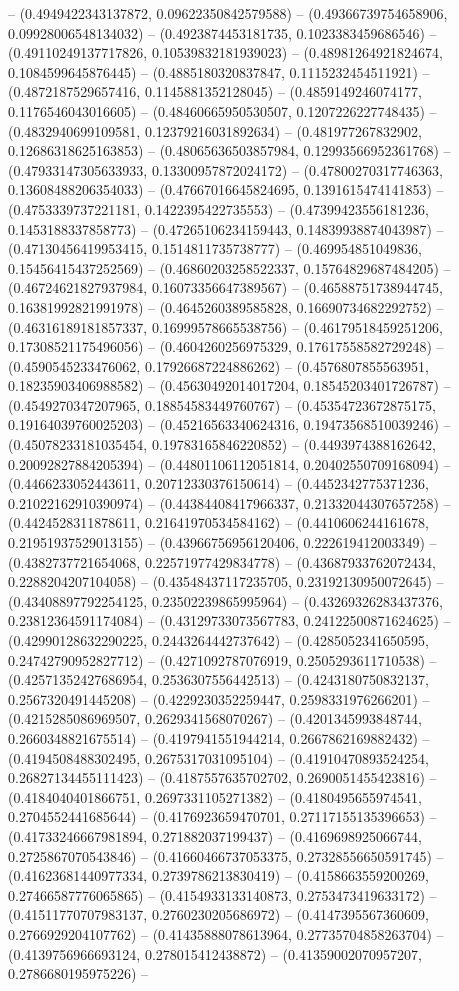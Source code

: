 -- (0.4949422343137872, 0.09622350842579588) -- (0.49366739754658906, 0.09928006548134032) -- (0.4923874453181735, 0.1023383459686546) -- (0.49110249137717826, 0.10539832181939023) -- (0.48981264921824674, 0.1084599645876445) -- (0.4885180320837847, 0.1115232454511921) -- (0.4872187529657416, 0.1145881352128045) -- (0.4859149246074177, 0.1176546043016605) -- (0.48460665950530507, 0.1207226227748435) -- (0.4832940699109581, 0.12379216031892634) -- (0.481977267832902, 0.12686318625163853) -- (0.48065636503857984, 0.12993566952361768) -- (0.47933147305633933, 0.13300957872024172) -- (0.47800270317746363, 0.13608488206354033) -- (0.47667016645824695, 0.1391615474141853) -- (0.4753339737221181, 0.1422395422735553) -- (0.47399423556181236, 0.1453188337858773) -- (0.47265106234159443, 0.14839938874043987) -- (0.47130456419953415, 0.1514811735738777) -- (0.469954851049836, 0.15456415437252569) -- (0.46860203258522337, 0.15764829687484205) -- (0.46724621827937984, 0.16073356647389567) -- (0.46588751738944745, 0.16381992821991978) -- (0.4645260389585828, 0.16690734682292752) -- (0.46316189181857337, 0.16999578665538756) -- (0.46179518459251206, 0.17308521175496056) -- (0.4604260256975329, 0.17617558582729248) -- (0.4590545233476062, 0.17926687224886262) -- (0.4576807855563951, 0.18235903406988582) -- (0.45630492014017204, 0.18545203401726787) -- (0.4549270347207965, 0.18854583449760767) -- (0.45354723672875175, 0.19164039760025203) -- (0.45216563340624316, 0.19473568510039246) -- (0.45078233181035454, 0.19783165846220852) -- (0.4493974388162642, 0.20092827884205394) -- (0.44801106112051814, 0.20402550709168094) -- (0.4466233052443611, 0.20712330376150614) -- (0.4452342775371236, 0.21022162910390974) -- (0.44384408417966337, 0.21332044307657258) -- (0.4424528311878611, 0.21641970534584162) -- (0.4410606244161678, 0.21951937529013155) -- (0.43966756956120406, 0.222619412003349) -- (0.4382737721654068, 0.22571977429834778) -- (0.43687933762072434, 0.2288204207104058) -- (0.43548437117235705, 0.23192130950072645) -- (0.43408897792254125, 0.23502239865995964) -- (0.43269326283437376, 0.23812364591174084) -- (0.43129733073567783, 0.24122500871624625) -- (0.42990128632290225, 0.2443264442737642) -- (0.4285052341650595, 0.24742790952827712) -- (0.4271092787076919, 0.2505293611710538) -- (0.42571352427686954, 0.2536307556442513) -- (0.4243180750832137, 0.2567320491445208) -- (0.4229230352259447, 0.2598331976266201) -- (0.4215285086969507, 0.2629341568070267) -- (0.4201345993848744, 0.2660348821675514) -- (0.4197941551944214, 0.2667862169882432) -- (0.4194508488302495, 0.2675317031095104) -- (0.41910470893524254, 0.26827134455111423) -- (0.4187557635702702, 0.2690051455423816) -- (0.4184040401866751, 0.2697331105271382) -- (0.4180495655974541, 0.2704552441685644) -- (0.4176923659470701, 0.27117155135396653) -- (0.41733246667981894, 0.271882037199437) -- (0.4169698925066744, 0.2725867070543846) -- (0.41660466737053375, 0.27328556650591745) -- (0.41623681440977334, 0.2739786213830419) -- (0.4158663559200269, 0.27466587776065865) -- (0.4154933133140873, 0.2753473419633172) -- (0.41511770707983137, 0.2760230205686972) -- (0.4147395567360609, 0.2766929204107762) -- (0.41435888078613964, 0.27735704858263704) -- (0.4139756966693124, 0.278015412438872) -- (0.41359002070957207, 0.2786680195975226) -- 